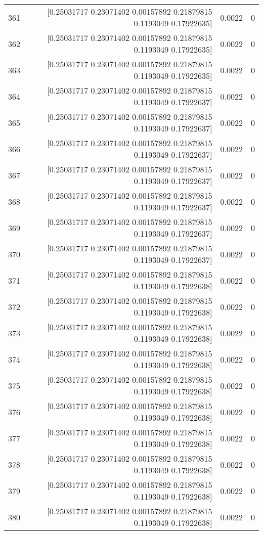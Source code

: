 \begin{longtable}{lrrr}
361 & [0.25031717 0.23071402 0.00157892 0.21879815 0.1193049  0.17922635] & 0.0022 & 0 \\
362 & [0.25031717 0.23071402 0.00157892 0.21879815 0.1193049  0.17922635] & 0.0022 & 0 \\
363 & [0.25031717 0.23071402 0.00157892 0.21879815 0.1193049  0.17922635] & 0.0022 & 0 \\
364 & [0.25031717 0.23071402 0.00157892 0.21879815 0.1193049  0.17922637] & 0.0022 & 0 \\
365 & [0.25031717 0.23071402 0.00157892 0.21879815 0.1193049  0.17922637] & 0.0022 & 0 \\
366 & [0.25031717 0.23071402 0.00157892 0.21879815 0.1193049  0.17922637] & 0.0022 & 0 \\
367 & [0.25031717 0.23071402 0.00157892 0.21879815 0.1193049  0.17922637] & 0.0022 & 0 \\
368 & [0.25031717 0.23071402 0.00157892 0.21879815 0.1193049  0.17922637] & 0.0022 & 0 \\
369 & [0.25031717 0.23071402 0.00157892 0.21879815 0.1193049  0.17922637] & 0.0022 & 0 \\
370 & [0.25031717 0.23071402 0.00157892 0.21879815 0.1193049  0.17922637] & 0.0022 & 0 \\
371 & [0.25031717 0.23071402 0.00157892 0.21879815 0.1193049  0.17922638] & 0.0022 & 0 \\
372 & [0.25031717 0.23071402 0.00157892 0.21879815 0.1193049  0.17922638] & 0.0022 & 0 \\
373 & [0.25031717 0.23071402 0.00157892 0.21879815 0.1193049  0.17922638] & 0.0022 & 0 \\
374 & [0.25031717 0.23071402 0.00157892 0.21879815 0.1193049  0.17922638] & 0.0022 & 0 \\
375 & [0.25031717 0.23071402 0.00157892 0.21879815 0.1193049  0.17922638] & 0.0022 & 0 \\
376 & [0.25031717 0.23071402 0.00157892 0.21879815 0.1193049  0.17922638] & 0.0022 & 0 \\
377 & [0.25031717 0.23071402 0.00157892 0.21879815 0.1193049  0.17922638] & 0.0022 & 0 \\
378 & [0.25031717 0.23071402 0.00157892 0.21879815 0.1193049  0.17922638] & 0.0022 & 0 \\
379 & [0.25031717 0.23071402 0.00157892 0.21879815 0.1193049  0.17922638] & 0.0022 & 0 \\
380 & [0.25031717 0.23071402 0.00157892 0.21879815 0.1193049  0.17922638] & 0.0022 & 0 \\

\end{longtable}

